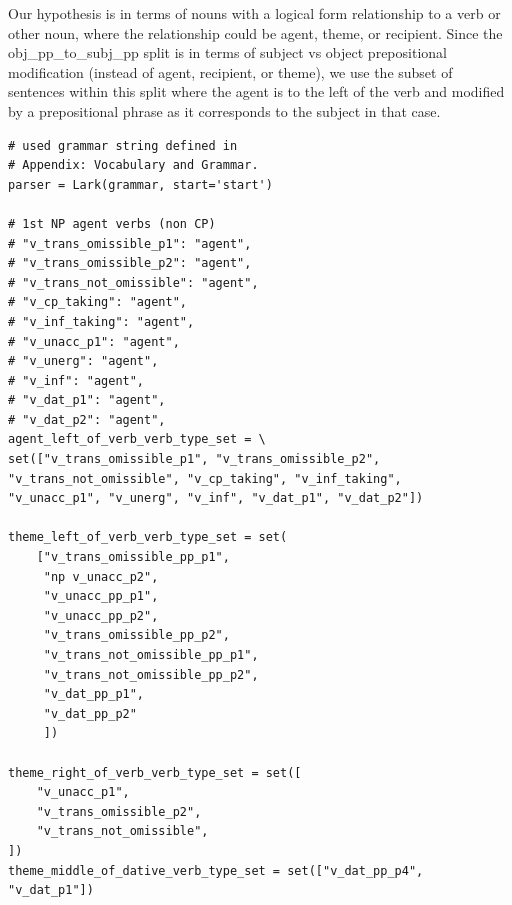 \documentclass[11pt]{article}
\begin{document}
Our hypothesis is in terms of nouns with a logical form relationship to a verb or other noun, where the relationship could be agent, theme, or recipient.
Since the obj\_pp\_to\_subj\_pp split is in terms of subject vs object prepositional modification (instead of agent, recipient, or theme), we use the subset of sentences within this split where the agent is to the left of the verb and modified by a prepositional phrase as it corresponds to the subject in that case.

\begin{tiny}
\begin{verbatim}
# used grammar string defined in 
# Appendix: Vocabulary and Grammar.
parser = Lark(grammar, start='start')

# 1st NP agent verbs (non CP)
# "v_trans_omissible_p1": "agent",
# "v_trans_omissible_p2": "agent",
# "v_trans_not_omissible": "agent",
# "v_cp_taking": "agent",
# "v_inf_taking": "agent",
# "v_unacc_p1": "agent",
# "v_unerg": "agent",
# "v_inf": "agent",
# "v_dat_p1": "agent",
# "v_dat_p2": "agent",
agent_left_of_verb_verb_type_set = \
set(["v_trans_omissible_p1", "v_trans_omissible_p2", 
"v_trans_not_omissible", "v_cp_taking", "v_inf_taking", 
"v_unacc_p1", "v_unerg", "v_inf", "v_dat_p1", "v_dat_p2"])

theme_left_of_verb_verb_type_set = set(
    ["v_trans_omissible_pp_p1",
     "np v_unacc_p2",
     "v_unacc_pp_p1",
     "v_unacc_pp_p2",
     "v_trans_omissible_pp_p2",
     "v_trans_not_omissible_pp_p1",
     "v_trans_not_omissible_pp_p2",
     "v_dat_pp_p1",
     "v_dat_pp_p2"
     ])

theme_right_of_verb_verb_type_set = set([
    "v_unacc_p1",
    "v_trans_omissible_p2",
    "v_trans_not_omissible",
])
theme_middle_of_dative_verb_type_set = set(["v_dat_pp_p4",
"v_dat_p1"])


\end{verbatim}
\end{tiny}
\end{document}
